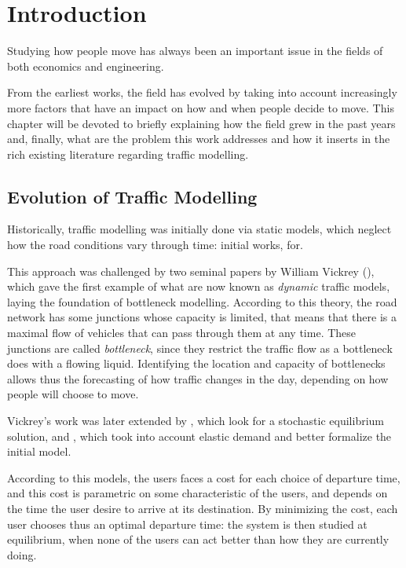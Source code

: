 
\chapter{Introduction}

Studying how people move has always been an important issue in the fields of both economics  and  engineering.

From the earliest works, the field has evolved by taking into account increasingly more factors that have an impact on how and when people decide to move.
This chapter will be devoted to briefly explaining how the field grew in the past years and,
finally, what are the problem this work addresses and how it inserts in the rich existing literature regarding traffic modelling.

\section{Evolution of Traffic Modelling}
\label{sec:hist}

Historically, traffic modelling was initially done via static models,
which neglect how the road conditions vary through time:
initial works, for.

This approach was challenged by two seminal papers by William Vickrey (\cite{f32d6720-dd02-34b7-a4ba-c4c21193efe7, 4ffb5da1-1f49-3898-98a7-209781744dc0}),
which gave the first example of what are now known as \textit{dynamic} traffic models,
laying the foundation of bottleneck modelling.
According to this theory, the road network has some junctions whose capacity is limited,
that means that there is a maximal flow of vehicles that can pass through them at any time.
These junctions are called \textit{bottleneck}, since they restrict the traffic flow as a bottleneck does with a flowing liquid.
Identifying the location and capacity of bottlenecks allows thus the forecasting of how traffic changes in the day,
depending on how people will choose to move.

Vickrey's work was later extended by \textcite{de1983stochastic}, which look for a stochastic equilibrium solution, and \textcite{d0907f84-e14a-3d98-ad20-759f41491d6e}, which took into account elastic demand and better formalize the initial model.

According to this models, the users faces a cost for each choice of departure time,
and this cost is parametric on some characteristic of the users,
and depends on the time the user desire to arrive at its destination.
By minimizing the cost, each user chooses thus an optimal departure time:
the system is then studied at equilibrium, when none of the users can act better than how they are currently doing.

